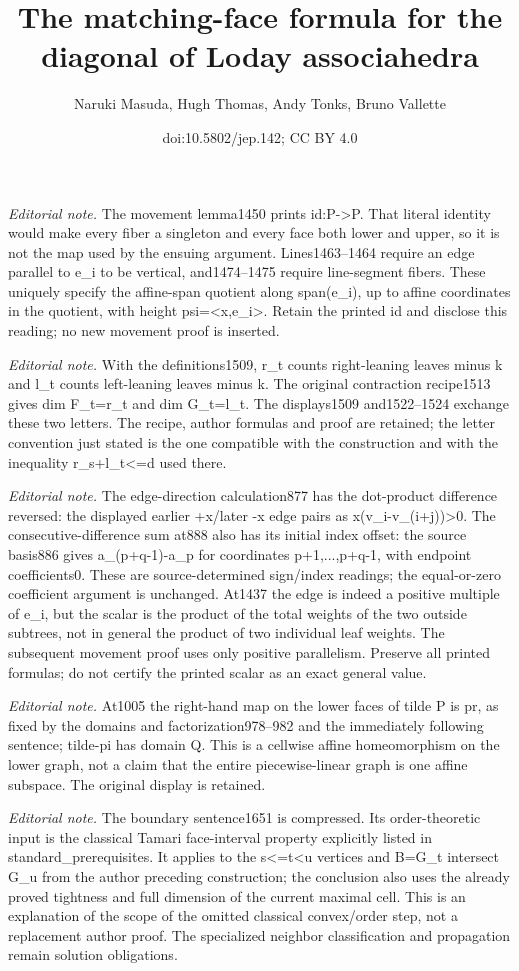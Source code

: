 \documentclass[10pt,a4paper]{amsart}
\title{The matching-face formula for the diagonal of Loday associahedra}
\author{Naruki Masuda, Hugh Thomas, Andy Tonks, Bruno Vallette}
\date{doi:10.5802/jep.142; CC BY 4.0}
\numberwithin{equation}{section}\providecommand{\No}{}
\theoremstyle{plain}
\theoremstyle{definition}
\begin{document}
\maketitle
\noindent\textit{Editorial note.} The movement lemma1450 prints id:P->P. That literal identity would make every fiber a singleton and every face both lower and upper, so it is not the map used by the ensuing argument. Lines1463–1464 require an edge parallel to e\_i to be vertical, and1474–1475 require line-segment fibers. These uniquely specify the affine-span quotient along span(e\_i), up to affine coordinates in the quotient, with height psi=<x,e\_i>. Retain the printed id and disclose this reading; no new movement proof is inserted.\par\medskip
\noindent\textit{Editorial note.} With the definitions1509, r\_t counts right-leaning leaves minus k and l\_t counts left-leaning leaves minus k. The original contraction recipe1513 gives dim F\_t=r\_t and dim G\_t=l\_t. The displays1509 and1522–1524 exchange these two letters. The recipe, author formulas and proof are retained; the letter convention just stated is the one compatible with the construction and with the inequality r\_s+l\_t<=d used there.\par\medskip
\noindent\textit{Editorial note.} The edge-direction calculation877 has the dot-product difference reversed: the displayed earlier +x/later -x edge pairs as x(v\_i-v\_(i+j))>0. The consecutive-difference sum at888 also has its initial index offset: the source basis886 gives a\_(p+q-1)-a\_p for coordinates p+1,...,p+q-1, with endpoint coefficients0. These are source-determined sign/index readings; the equal-or-zero coefficient argument is unchanged. At1437 the edge is indeed a positive multiple of e\_i, but the scalar is the product of the total weights of the two outside subtrees, not in general the product of two individual leaf weights. The subsequent movement proof uses only positive parallelism. Preserve all printed formulas; do not certify the printed scalar as an exact general value.\par\medskip
\noindent\textit{Editorial note.} At1005 the right-hand map on the lower faces of tilde P is pr, as fixed by the domains and factorization978–982 and the immediately following sentence; tilde-pi has domain Q. This is a cellwise affine homeomorphism on the lower graph, not a claim that the entire piecewise-linear graph is one affine subspace. The original display is retained.\par\medskip
\noindent\textit{Editorial note.} The boundary sentence1651 is compressed. Its order-theoretic input is the classical Tamari face-interval property explicitly listed in standard\_prerequisites. It applies to the s<=t<u vertices and B=G\_t intersect G\_u from the author preceding construction; the conclusion also uses the already proved tightness and full dimension of the current maximal cell. This is an explanation of the scope of the omitted classical convex/order step, not a replacement author proof. The specialized neighbor classification and propagation remain solution obligations.\par\medskip
\end{document}
